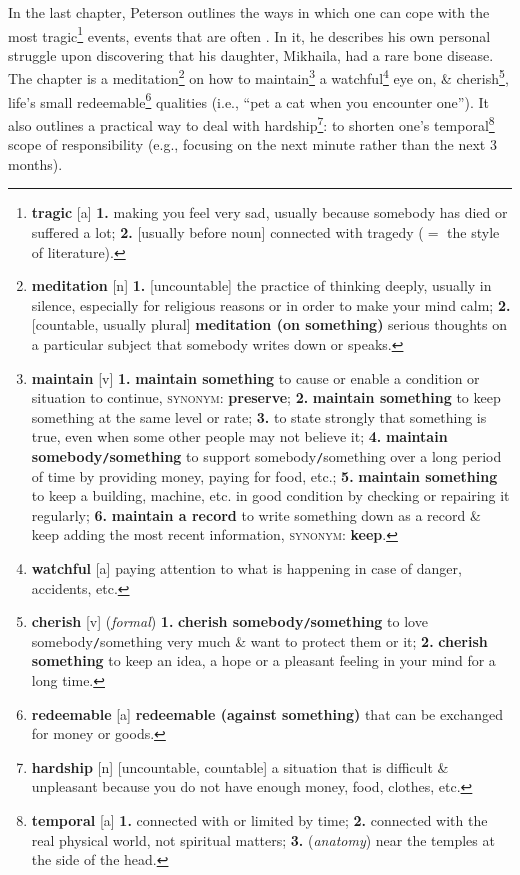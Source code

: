 \documentclass[oneside]{book}
\numberwithin{equation}{section}
\begin{document}
In the last chapter, Peterson outlines the ways in which one can cope with the most tragic\footnote{\textbf{tragic} [a] \textbf{1.} making you feel very sad, usually because somebody has died or suffered a lot; \textbf{2.} [usually before noun] connected with tragedy ($=$ the style of literature).} events, events that are often . In it, he describes his own personal struggle upon discovering that his daughter, Mikhaila, had a rare bone disease. The chapter is a meditation\footnote{\textbf{meditation} [n] \textbf{1.} [uncountable] the practice of thinking deeply, usually in silence, especially for religious reasons or in order to make your mind calm; \textbf{2.} [countable, usually plural] \textbf{meditation (on something)} serious thoughts on a particular subject that somebody writes down or speaks.} on how to maintain\footnote{\textbf{maintain} [v] \textbf{1.} \textbf{maintain something} to cause or enable a condition or situation to continue, \textsc{synonym}: \textbf{preserve}; \textbf{2.} \textbf{maintain something} to keep something at the same level or rate; \textbf{3.} to state strongly that something is true, even when some other people may not believe it; \textbf{4.} \textbf{maintain somebody\texttt{/}something} to support somebody\texttt{/}something over a long period of time by providing money, paying for food, etc.; \textbf{5.} \textbf{maintain something} to keep a building, machine, etc. in good condition by checking or repairing it regularly; \textbf{6.} \textbf{maintain a record} to write something down as a record \& keep adding the most recent information, \textsc{synonym}: \textbf{keep}.} a watchful\footnote{\textbf{watchful} [a] paying attention to what is happening in case of danger, accidents, etc.} eye on, \& cherish\footnote{\textbf{cherish} [v] (\textit{formal}) \textbf{1.} \textbf{cherish somebody\texttt{/}something} to love somebody\texttt{/}something very much \& want to protect them or it; \textbf{2.} \textbf{cherish something} to keep an idea, a hope or a pleasant feeling in your mind for a long time.}, life's small redeemable\footnote{\textbf{redeemable} [a] \textbf{redeemable (against something)} that can be exchanged for money or goods.} qualities (i.e., ``pet a cat when you encounter one''). It also outlines a practical way to deal with hardship\footnote{\textbf{hardship} [n] [uncountable, countable] a situation that is difficult \& unpleasant because you do not have enough money, food, clothes, etc.}: to shorten one's temporal\footnote{\textbf{temporal} [a] \textbf{1.} connected with or limited by time; \textbf{2.} connected with the real physical world, not spiritual matters; \textbf{3.} (\textit{anatomy}) near the temples at the side of the head.} scope of responsibility (e.g., focusing on the next minute rather than the next 3 months).
\end{document}
